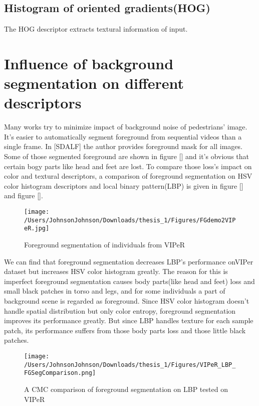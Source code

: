 \subsection{Histogram of oriented gradients(HOG)}
The HOG descriptor extracts textural information of input. 



\section{Influence of background segmentation on different descriptors}
Many works try to minimize impact of background noise of pedestrians' image. It's easier to automatically segment foreground from sequential videos than a single frame. In [SDALF] the author provides foreground mask for all images.  Some of those segmented foreground are shown in figure [] and it's obvious that certain bogy parts like head and feet are lost. To compare those loss's impact on color and textural descriptors, a comparison of foreground segmentation on HSV color histogram descriptors and local binary pattern(LBP) is given in figure [] and figure []. 


\begin{figure}[H]
\centering
\texttt{[image: /Users/JohnsonJohnson/Downloads/thesis\_1/Figures/FGdemo2VIPeR.jpg]}
\caption{Foreground segmentation of individuals from VIPeR }
\vspace{0em}
\end{figure} 

We can find that foreground segmentation decreases LBP's performance onVIPer dataset but increases HSV color histogram greatly. The reason for this is imperfect foreground segmentation causes body parts(like head and feet) loss and small black patches in torso and legs, and for some individuals a part of background scene is regarded as foreground. Since HSV color histogram doesn't handle spatial distribution but only color entropy, foreground segmentation improves its performance greatly. But since LBP handles texture for each sample patch, its performance suffers from those body parts loss and those little black patches. 

\begin{figure}[H]
\centering

\texttt{[image: /Users/JohnsonJohnson/Downloads/thesis\_1/Figures/VIPeR\_LBP\_FGSegComparison.png]}
\caption{A CMC comparison of foreground segmentation on LBP tested on VIPeR }
\vspace{0em}
\end{figure} 

